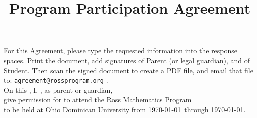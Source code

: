 \documentclass{ross}
\title{Program Participation Agreement}
\begin{document}
\maketitle
For this Agreement, please type the requested information into the response spaces.
Print the document, add signatures of Parent (or legal guardian), and of Student.  
Then scan the signed document to create a PDF file, and email that file
to: \texttt{agreement@rossprogram.org} . \\

On this , I, , as parent or guardian, \\[5pt]
 give permission for  to attend the Ross Mathematics Program \\[5pt]
 to be held at Ohio Dominican University from \startsunday\today\ through
\finishfriday\today.
\end{document}
